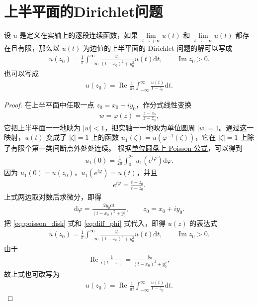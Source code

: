 \documentclass[../../main.tex]{subfiles}%
\begin{document}
\section{上半平面的Dirichlet问题}

\begin{theorem}
\label{thm:dirichlet}
设 \(u\) 是定义在实轴上的逐段连续函数，如果 \(\lim\limits_{t\to+\infty}u(t)\) 和 \(\lim\limits_{t\to-\infty}u(t)\) 都存在且有限，那么以 \(u(t)\) 为边值的上半平面的 Dirichlet 问题的解可以写成
\begin{align}\label{eq:dirichlet_half_plane_1}
u(z_0)=\frac{1}{\pi} \int_{-\infty}^{\infty} \frac{y_0}{(t-x_0)^2+y_0^2}u(t)\mathrm{d}t, \qquad \operatorname{Im} z_0>0. 
\end{align}
也可以写成
\begin{align}\label{eq:dirichlet_half_plane_2}
u(z_0)=\operatorname{Re} \frac{1}{\pi i} \int_{-\infty}^{\infty} \frac{u(t)}{t-z_0}\mathrm{d}t.
\end{align}
\end{theorem}

\begin{proof}
在上半平面中任取一点 \(z_0=x_0+iy_0\)，作分式线性变换
\begin{align*}
w=\varphi(z)=\frac{z-z_0}{z-\overline{z}_0},
\end{align*}
它把上半平面一一地映为 \(|w|<1\)，把实轴一一地映为单位圆周 \(|w|=1\)。通过这一映射，\(u(t)\) 变成了 \(|\zeta|=1\) 上的函数 \(u_1(\zeta)=u(\varphi^{-1}(\zeta))\)，它在 \(|\zeta|=1\) 上除了有限个第一类间断点外处处连续。
根据\hyperref[theorem:poisson_theta]{单位圆盘上 Poisson 公式}，可以得到
\begin{align}
u_1(0)=\frac{1}{2\pi} \int_{0}^{2\pi} u_1(e^{i\varphi})\mathrm{d}\varphi. \label{eq:poisson_disk}
\end{align}
因为 \(u_1(0)=u(z_0)\)，\(u_1(e^{i\varphi})=u(t)\)，并且
\begin{align*}
e^{i\varphi}=\frac{t-z_0}{t-\overline{z}_0}.
\end{align*}
上式两边取对数后求微分，即得
\begin{align}
\mathrm{d}\varphi=\frac{2y_0\mathrm{d}t}{(t-x_0)^2+y_0^2}, \qquad z_0=x_0+iy_0. \label{eq:diff_phi}
\end{align}
把 \eqref{eq:poisson_disk} 式和 \eqref{eq:diff_phi} 式代入，即得 \(u(z)\) 的表达式
\begin{align*}
u(z_0)=\frac{1}{\pi} \int_{-\infty}^{\infty} \frac{y_0}{(t-x_0)^2+y_0^2}u(t)\mathrm{d}t, \qquad \operatorname{Im} z_0>0. 
\end{align*}
由于
\begin{align*}
\operatorname{Re}\frac{1}{i(t-z_0)}=\frac{y_0}{(t-x_0)^2+y_0^2},
\end{align*}
故上式也可改写为
\begin{align*}
u(z_0)=\operatorname{Re} \frac{1}{\pi i} \int_{-\infty}^{\infty} \frac{u(t)}{t-z_0}\mathrm{d}t.
\end{align*}
\end{proof}
\end{document}

